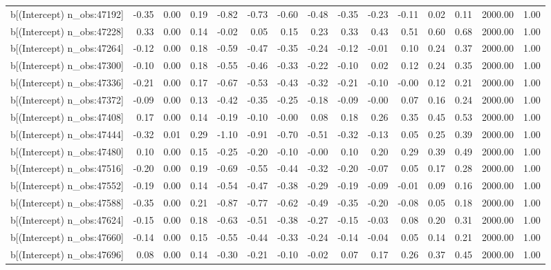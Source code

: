 \begin{table}[ht]
\begin{tabular}{rrrrrrrrrrrrrrr}
  b[(Intercept) n\_obs:47192] & -0.35 & 0.00 & 0.19 & -0.82 & -0.73 & -0.60 & -0.48 & -0.35 & -0.23 & -0.11 & 0.02 & 0.11 & 2000.00 & 1.00 \\ 
  b[(Intercept) n\_obs:47228] & 0.33 & 0.00 & 0.14 & -0.02 & 0.05 & 0.15 & 0.23 & 0.33 & 0.43 & 0.51 & 0.60 & 0.68 & 2000.00 & 1.00 \\ 
  b[(Intercept) n\_obs:47264] & -0.12 & 0.00 & 0.18 & -0.59 & -0.47 & -0.35 & -0.24 & -0.12 & -0.01 & 0.10 & 0.24 & 0.37 & 2000.00 & 1.00 \\ 
  b[(Intercept) n\_obs:47300] & -0.10 & 0.00 & 0.18 & -0.55 & -0.46 & -0.33 & -0.22 & -0.10 & 0.02 & 0.12 & 0.24 & 0.35 & 2000.00 & 1.00 \\ 
  b[(Intercept) n\_obs:47336] & -0.21 & 0.00 & 0.17 & -0.67 & -0.53 & -0.43 & -0.32 & -0.21 & -0.10 & -0.00 & 0.12 & 0.21 & 2000.00 & 1.00 \\ 
  b[(Intercept) n\_obs:47372] & -0.09 & 0.00 & 0.13 & -0.42 & -0.35 & -0.25 & -0.18 & -0.09 & -0.00 & 0.07 & 0.16 & 0.24 & 2000.00 & 1.00 \\ 
  b[(Intercept) n\_obs:47408] & 0.17 & 0.00 & 0.14 & -0.19 & -0.10 & -0.00 & 0.08 & 0.18 & 0.26 & 0.35 & 0.45 & 0.53 & 2000.00 & 1.00 \\ 
  b[(Intercept) n\_obs:47444] & -0.32 & 0.01 & 0.29 & -1.10 & -0.91 & -0.70 & -0.51 & -0.32 & -0.13 & 0.05 & 0.25 & 0.39 & 2000.00 & 1.00 \\ 
  b[(Intercept) n\_obs:47480] & 0.10 & 0.00 & 0.15 & -0.25 & -0.20 & -0.10 & -0.00 & 0.10 & 0.20 & 0.29 & 0.39 & 0.49 & 2000.00 & 1.00 \\ 
  b[(Intercept) n\_obs:47516] & -0.20 & 0.00 & 0.19 & -0.69 & -0.55 & -0.44 & -0.32 & -0.20 & -0.07 & 0.05 & 0.17 & 0.28 & 2000.00 & 1.00 \\ 
  b[(Intercept) n\_obs:47552] & -0.19 & 0.00 & 0.14 & -0.54 & -0.47 & -0.38 & -0.29 & -0.19 & -0.09 & -0.01 & 0.09 & 0.16 & 2000.00 & 1.00 \\ 
  b[(Intercept) n\_obs:47588] & -0.35 & 0.00 & 0.21 & -0.87 & -0.77 & -0.62 & -0.49 & -0.35 & -0.20 & -0.08 & 0.05 & 0.18 & 2000.00 & 1.00 \\ 
  b[(Intercept) n\_obs:47624] & -0.15 & 0.00 & 0.18 & -0.63 & -0.51 & -0.38 & -0.27 & -0.15 & -0.03 & 0.08 & 0.20 & 0.31 & 2000.00 & 1.00 \\ 
  b[(Intercept) n\_obs:47660] & -0.14 & 0.00 & 0.15 & -0.55 & -0.44 & -0.33 & -0.24 & -0.14 & -0.04 & 0.05 & 0.14 & 0.21 & 2000.00 & 1.00 \\ 
  b[(Intercept) n\_obs:47696] & 0.08 & 0.00 & 0.14 & -0.30 & -0.21 & -0.10 & -0.02 & 0.07 & 0.17 & 0.26 & 0.37 & 0.45 & 2000.00 & 1.00 \\ 

\end{tabular}
\end{table}
